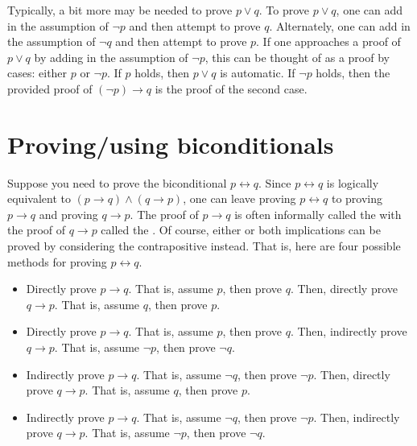 \documentclass{book}
\theoremstyle{ekimcustom}
\newcommand\defn[1]{{\color{blue}{\bf #1}}}
\begin{document}
Typically, a bit more may be needed to prove $p \vee q$. To prove $p \vee q$, one can add in the assumption of $\neg p$ and then attempt to prove $q$. Alternately, one can add in the assumption of $\neg q$ and then attempt to prove $p$. If one approaches a proof of  $p \vee q$ by adding in the assumption of $\neg p$, this can be thought of as a proof by cases: either $p$ or $\neg p$. If $p$ holds, then $p \vee q$ is automatic. If $\neg p$ holds, then the provided proof of $(\neg p) \rightarrow q$ is the proof of the second case.

\section{Proving/using biconditionals}

Suppose you need to prove the biconditional $p \leftrightarrow q$. Since $p \leftrightarrow q$ is logically equivalent to $(p \rightarrow q) \wedge (q \rightarrow p)$, one can leave proving $p \leftrightarrow q$ to proving $p \rightarrow q$ and proving $q \rightarrow p$. The proof of $p \rightarrow q$ is often informally called the \defn{forward direction} with the proof of $q \rightarrow p$ called the \defn{reverse direction}. Of course, either or both implications can be proved by considering the contrapositive instead. That is, here are four possible methods for proving $p \leftrightarrow q$.
\begin{itemize}

\item
Directly prove $p \rightarrow q$. That is, assume $p$, then prove $q$.
Then, directly prove $q \rightarrow p$. That is, assume $q$, then prove $p$.

\item
Directly prove $p \rightarrow q$. That is, assume $p$, then prove $q$.
Then, indirectly prove $q \rightarrow p$. That is, assume $\neg p$, then prove $\neg q$.

\item
Indirectly prove $p \rightarrow q$. That is, assume $\neg q$, then prove $\neg p$.
Then, directly prove $q \rightarrow p$. That is, assume $q$, then prove $p$.

\item
Indirectly prove $p \rightarrow q$. That is, assume $\neg q$, then prove $\neg p$.
Then, indirectly prove $q \rightarrow p$. That is, assume $\neg p$, then prove $\neg q$.

%
\end{itemize}%
\end{document}
